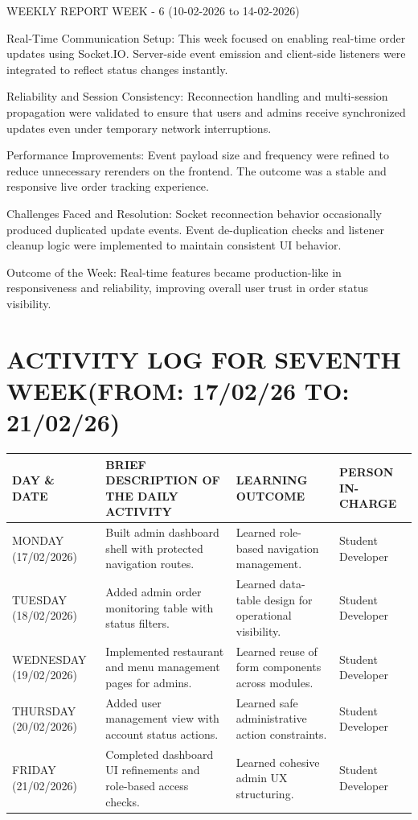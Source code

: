 \documentclass[12pt,a4paper]{report}
\begin{document}
WEEKLY REPORT
WEEK - 6 (10-02-2026 to 14-02-2026)

Real-Time Communication Setup:
This week focused on enabling real-time order updates using Socket.IO. Server-side event emission and client-side listeners were integrated to reflect status changes instantly.

Reliability and Session Consistency:
Reconnection handling and multi-session propagation were validated to ensure that users and admins receive synchronized updates even under temporary network interruptions.

Performance Improvements:
Event payload size and frequency were refined to reduce unnecessary rerenders on the frontend. The outcome was a stable and responsive live order tracking experience.

Challenges Faced and Resolution:
Socket reconnection behavior occasionally produced duplicated update events. Event de-duplication checks and listener cleanup logic were implemented to maintain consistent UI behavior.

Outcome of the Week:
Real-time features became production-like in responsiveness and reliability, improving overall user trust in order status visibility.

\section*{ACTIVITY LOG FOR SEVENTH WEEK(FROM: 17/02/26 TO: 21/02/26)}
\begin{longtable}{|p{2.2cm}|p{5.2cm}|p{4.3cm}|p{3.2cm}|}
\hline
\textbf{DAY \& DATE} & \textbf{BRIEF DESCRIPTION OF THE DAILY ACTIVITY} & \textbf{LEARNING OUTCOME} & \textbf{PERSON IN- CHARGE} \\
\hline
MONDAY (17/02/2026) & Built admin dashboard shell with protected navigation routes. & Learned role-based navigation management. & Student Developer \\
\hline
TUESDAY (18/02/2026) & Added admin order monitoring table with status filters. & Learned data-table design for operational visibility. & Student Developer \\
\hline
WEDNESDAY (19/02/2026) & Implemented restaurant and menu management pages for admins. & Learned reuse of form components across modules. & Student Developer \\
\hline
THURSDAY (20/02/2026) & Added user management view with account status actions. & Learned safe administrative action constraints. & Student Developer \\
\hline
FRIDAY (21/02/2026) & Completed dashboard UI refinements and role-based access checks. & Learned cohesive admin UX structuring. & Student Developer \\
\hline
\end{longtable}
\end{document}
